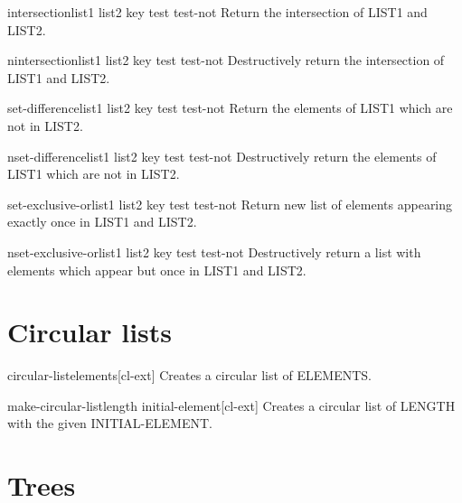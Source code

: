 \documentclass[10pt,english]{book}
\begin{document}
\begin{function}{intersection}{list1 list2 \key key test test-not}
  Return the intersection of LIST1 and LIST2.
\end{function}

\begin{function}{nintersection}{list1 list2 \key key test test-not}
  Destructively return the intersection of LIST1 and LIST2.
\end{function}

\begin{function}{set-difference}{list1 list2 \key key test test-not}
  Return the elements of LIST1 which are not in LIST2.
\end{function}

\begin{function}{nset-difference}{list1 list2 \key key test test-not}
  Destructively return the elements of LIST1 which are not in LIST2.
\end{function}

\begin{function}{set-exclusive-or}{list1 list2 \key key test test-not}
  Return new list of elements appearing exactly once in LIST1 and LIST2.
\end{function}

\begin{function}{nset-exclusive-or}{list1 list2 \key key test test-not}
  Destructively return a list with elements which appear but once in LIST1
   and LIST2.
\end{function}

\section{Circular lists}
\label{sec:circular-lists}

\begin{function}{circular-list}{\rest elements}[cl-ext]
  Creates a circular list of ELEMENTS.
\end{function}

\begin{function}{make-circular-list}{length \key initial-element}[cl-ext]
  Creates a circular list of LENGTH with the given INITIAL-ELEMENT.
\end{function}

\section{Trees}
\label{sec:trees}
\end{document}
